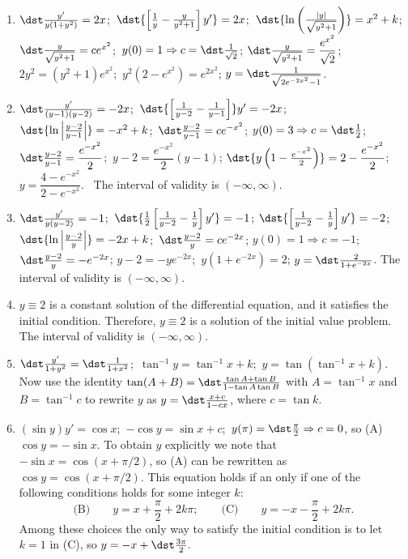 \documentclass[openany]{book}
\newenvironment{sectionSolutions}{
 \begin{enumerate}[item-label={\thesection.\arabic{enumi}.}]
}{
 \end{enumerate}
}
\begin{document}
\begin{sectionSolutions}
\item
$\dst\frac{y'}{ y(1+y^2)}=2x$;\ $\dst{\left[\frac{1}{ y}-\frac{y}{
y^2+1}\right]y'}=2x$;\ $\dst{\ln\left(\frac{|y|}{
\sqrt{y^2+1}}\right)}=x^2+k$;\ $\dst\frac{y}{
\sqrt{y^2+1}}=ce^{x^2}$;\ $y(0)=1\Rightarrow c=\dst\frac{1}{\sqrt2}$;\;
$\dst\frac{y}{\sqrt{y^2+1}}=\dfrac{e^{x^2}}{\sqrt2}$;\;
$2y^2=(y^2+1)e^{x^2}$;\ $y^2(2-e^{x^2})=e^{2x^2}$;
$y=\dst\frac{1}{\sqrt{2e^{-2x^2}-1}}$.


\item
$\dst\frac{y'}{(y-1)(y-2)}=-2x$;\ $\dst{\left[\frac{1}{
y-2}-\frac{1}{ y-1}\right]}y'=-2x$;\ $\dst{\ln\left|\frac{y-2}{
y-1}\right|}=-x^2+k$;\ $\dst\frac{y-2}{ y-1}=ce^{-x^2}$;\;
$y(0)=3\Rightarrow c=\dst\frac{1}{2}$;\ $\dst\frac{y-2}{
y-1}=\dfrac{e^{-x^2}}{2}$;\ $y-2=\dfrac{e^{-x^2}}{2}(y-1)$;\;
$\dst{y\left(1-\frac{e^{-x^2}}{2}\right)}=2-\dfrac{e^{-x^2}}{2}$;\;
$y=\dfrac{4-e^{-x^2}}{2-e^{-x^2}}$. \
The interval of validity is $(-\infty,\infty)$.



\item
$\dst\frac{y'}{ y(y-2)}=-1$;\ $\dst{\frac{1}{2}\left[\frac{1}{
y-2}-\frac{1}{ y}\right]y'}=-1$;\;
 $\dst{\left[\frac{1}{
y-2}-\frac{1}{ y}\right]y'}=-2$;\ $\dst{\ln\left|\frac{y-2}{
y}\right|}=-2x+k$;\ $\dst\frac{y-2}{ y}=ce^{-2x}$;\;
$y(0)=1\Rightarrow c=-1$;\ $\dst\frac{y-2}{ y}=-e^{-2x}$;\;
$y-2=-ye^{-2x}$;\ $y(1+e^{-2x})=2$;\;
   $y=\dst\frac{2}{
1+e^{-2x}}$. The interval of validity is $(-\infty,\infty)$.


\item
$y\equiv2$ is a constant solution of the differential equation, and
it satisfies the initial condition. Therefore, $y\equiv2$ is a
solution of the initial value problem. The interval of validity is
$(-\infty,\infty)$.



\item
$\dst\frac{y'}{1+y^2}=\dst\frac{1}{1+x^2}$;\ $\tan^{-1}y=
\tan^{-1}x+k$;\ $y=\tan(\tan^{-1}x+k)$. Now use
the identity $\tan(A+B)=\dst\frac{\tan A+\tan B}{1-\tan A\tan B}$ with
$A=\tan^{-1}x$ and $B=\tan^{-1}c$ to rewrite $y$ as
$y=\dst\frac{x+c}{1-cx}$, where $c=\tan k$.

\item
$(\sin y)y'=\cos x$;\ $-\cos
y=\sin x+c$;\  $y(\pi)=\dst\frac{\pi}{2}\Rightarrow
c=0$, so (A)  $\cos y=-\sin
x$. To obtain $y$ explicitly we  note that $-\sin x=\cos(x+\pi/2)$, so
(A) can be rewritten as  $\cos y=\cos(x+\pi/2)$. This equation
holds if an only if one of the following conditions holds for some
integer $k$:
\[
\text{(B)}\qquad y=x+\frac{\pi}{2}+2k\pi;\qquad
\text{(C)}\qquad y=-x-\frac{\pi}{2}+2k\pi.
\]
Among these choices the only way to satisfy the initial condition
is to let $k=1$ in (C), so $y=-x+\dst\frac{3\pi}{2}.$




\end{sectionSolutions}
\end{document}

